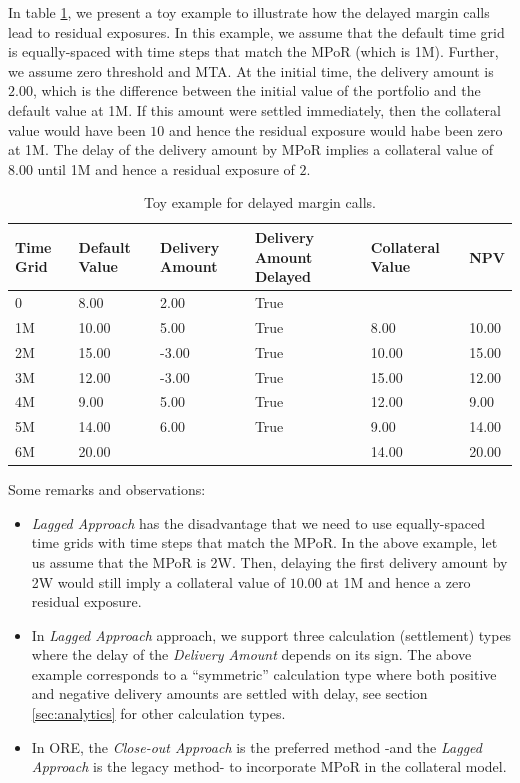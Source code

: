 \documentclass[12pt, a4paper]{article}
\begin{document}
{\begin{appendix}
In table \ref{table:lagged}, we present a toy example to illustrate how the delayed margin calls lead to residual exposures. In this example, we assume that the default time grid is equally-spaced with time steps that match the MPoR (which is 1M). Further, we assume zero threshold and MTA. At the initial time, the delivery amount is $2.00$, which is the difference between the initial value of the portfolio and the default value at 1M. If this amount were settled immediately, then the collateral value would have been $10$ and hence the residual exposure would habe been zero at 1M. The delay of the delivery amount by MPoR implies a collateral value of $8.00$ until 1M and hence a residual exposure of $2$. 
%
\begin{table}[!ht]
    \centering
    \begin{tabular}{|p{1cm}|p{1.4cm}|p{1.5cm}|p{1.5cm}|p{1.6cm}|p{}|}
    \hline
        Time Grid & Default Value & Delivery Amount & Delivery Amount Delayed  & Collateral Value   & NPV  \\ \hline
         0 & 8.00 & 2.00 &   True &~ &  ~   \\ \hline
        1M & 10.00 & 5.00& True & 8.00&  10.00   \\ \hline
        2M & 15.00 & -3.00 & True & 10.00 & 15.00 \\ \hline
        3M & 12.00 & -3.00 & True & 15.00 & 12.00  \\ \hline
        4M & 9.00 & 5.00 & True & 12.00 & 9.00   \\ \hline
        5M & 14.00 & 6.00 & True & 9.00 & 14.00  \\ \hline
        6M & 20.00 &  ~  & ~ & 14.00 & 20.00  \\ \hline
    \end{tabular}
    \caption{Toy example for delayed margin calls.}\label{table:lagged}
\end{table}
%

Some remarks and observations:
\begin{itemize}
 \item {\em Lagged Approach}  has the disadvantage that we need to use equally-spaced time grids with time steps that match the MPoR. In the above example, let us assume that the MPoR is 2W. Then, delaying the first delivery amount by 2W would still imply a collateral value of $10.00$ at 1M and hence a zero residual exposure.
  \item In {\em Lagged Approach} approach, we support three calculation (settlement) types where the delay of the {\em Delivery Amount } depends on its sign. The above example corresponds to a ``symmetric'' calculation type where both positive and negative delivery amounts are settled with delay, see section \ref{sec:analytics} for other calculation types.
   \item In ORE, the {\em Close-out Approach} is the preferred method -and the {\em Lagged Approach} is the legacy method- to incorporate MPoR in the collateral model. 
\end{itemize}

\end{appendix}}
\end{document}
